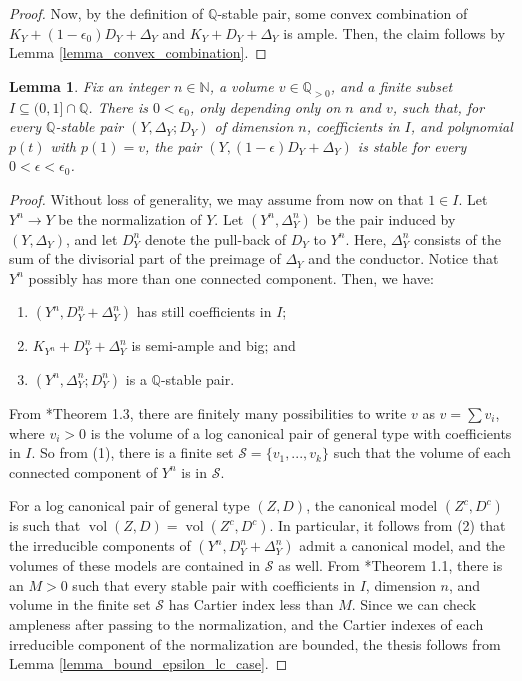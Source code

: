 \documentclass{amsart}
\newcommand{\bQ}{\mathbb{Q}}
\newcommand{\sS}{\mathscr{S}}
\newcommand{\cS}{\mathcal{S}}
\newtheorem{Lemma}[theorem]{Lemma}
\theoremstyle{definition}
\DeclareMathOperator{\vol}{vol}
\begin{document}
\begin{proof}
Now, by the definition of $\bQ$-stable pair, some convex combination of $K_Y+(1-\epsilon_0)D_Y+\Delta_Y$ and $K_Y+D_Y+\Delta_Y$ is ample.
Then, the claim follows by Lemma \ref{lemma_convex_combination}.
\end{proof}

\begin{Lemma}\label{lemma_bound_for_epsilon}
Fix an integer $n\in \mathbb{N}$, a volume $v\in \mathbb{Q}_{>0}$, and a finite subset $I\subseteq (0,1] \cap \mathbb{Q}$.
There is $0<\epsilon_0$, only depending only on $n$ and $v$, such that, for every $\bQ$-stable pair $(Y,\Delta_Y;D_Y)$ of dimension $n$, coefficients in $I$, and polynomial $p(t)$ with $p(1) = v$, the pair $(Y,(1-\epsilon)D_Y+\Delta_Y)$ is stable for every $0<\epsilon < \epsilon_0$.
\end{Lemma}

\begin{proof}
Without loss of generality, we may assume from now on that $1 \in I$.
Let $Y^n\to Y$ be the normalization of $Y$.
Let $(Y^n,\Delta_Y^n)$ be the pair induced by $(Y,\Delta_Y)$, and let $D_Y^n$ denote the pull-back of $D_Y$ to $Y^n$.
Here, $\Delta_Y^n$ consists of the sum of the divisorial part of the preimage of $\Delta_Y$ and the conductor.
Notice that $Y^n$ possibly has more than one connected component.
Then, we have:
\begin{enumerate}
     \item $(Y^n,D_Y^n+\Delta_Y^n)$ has still coefficients in $I$;
     \item $K_{Y^n} + D_Y^n+\Delta_Y^n$ is semi-ample and big; and
     \item $(Y^n,\Delta_Y^n;D_Y^n)$ is a $\bQ$-stable pair.
\end{enumerate}
From \cite{HMX14}*{Theorem 1.3},
there are finitely many possibilities to write $v$ as $v = \sum v_i$, where $v_i>0$ is the volume of a log canonical pair of general type with coefficients in $I$.
So from (1), there is a finite set $\sS=\{v_1,...,v_k\}$ such that the volume of each connected component of $Y^n$ is in $\sS$. 

For a log canonical pair of general type $(Z,D)$,
the canonical model $(Z^c,D^c)$ %
is such that $\vol(Z,D) = \vol(Z^c,D^c)$.
In particular, it follows from (2) that the irreducible components of $(Y^n,D_Y^n+\Delta_Y^n)$ admit a canonical model, and the volumes of these models are contained in $\cS$ as well.
From \cite{HMX}*{Theorem 1.1}, there is an $M>0$ such that every stable pair with coefficients in $I$, dimension $n$, and volume in the finite set $\sS$ has Cartier index less than $M$.
Since we can check ampleness after passing to the normalization, and the Cartier indexes of each irreducible component of the normalization are bounded, the thesis follows from Lemma \ref{lemma_bound_epsilon_lc_case}.
\end{proof}
\end{document}
